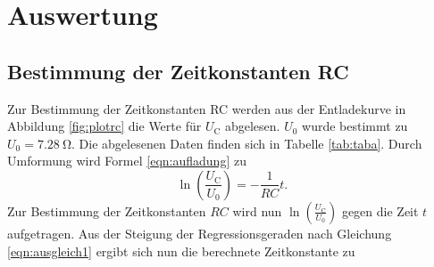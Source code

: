\section{Auswertung}
\label{sec:Auswertung}
\subsection{Bestimmung der Zeitkonstanten RC}
Zur Bestimmung der Zeitkonstanten RC werden aus der Entladekurve in Abbildung \ref{fig:plotrc} die Werte für $U_\text{C}$ abgelesen.
$U_\text{0}$ wurde bestimmt zu $U_\text{0}=\SI{7.28}{\ohm}$.
Die abgelesenen Daten finden sich in Tabelle \ref{tab:taba}.
Durch Umformung wird Formel \eqref{eqn:aufladung} zu
\begin{equation}
	\label{eqn:ausgleich1}
	\ln\left(\frac{U_\text{C}}{U_\text{0}}\right)=-\frac{1}{RC}t .
\end{equation}
Zur Bestimmung der Zeitkonstanten $RC$ wird nun $\ln\left(\frac{U_\text{C}}{U_\text{0}}\right)$ gegen die Zeit $t$ aufgetragen.
Aus der Steigung der Regressionsgeraden nach Gleichung \eqref{eqn:ausgleich1} ergibt sich nun die berechnete Zeitkonstante zu


